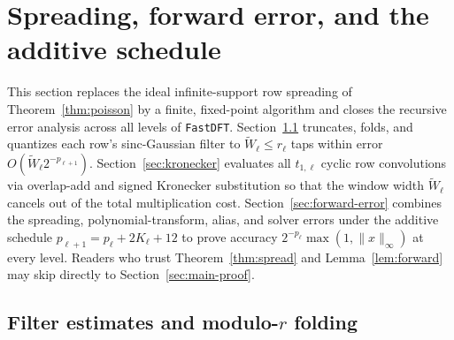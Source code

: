 \section{Spreading, forward error, and the additive schedule}\label{sec:spread-and-error}

This section replaces the ideal infinite-support row spreading of Theorem~\ref{thm:poisson} by a finite, fixed-point algorithm and closes the recursive error analysis across all levels of \texttt{FastDFT}. Section~\ref{sec:filter-norms} truncates, folds, and quantizes each row's sinc-Gaussian filter to $\tilde{W}_\ell \le r_\ell$ taps within error $O(\tilde{W}_\ell 2^{-p_{\ell+1}})$. Section~\ref{sec:kronecker} evaluates all $t_{1,\ell}$ cyclic row convolutions via overlap-add and signed Kronecker substitution so that the window width $\tilde{W}_\ell$ cancels out of the total multiplication cost. Section~\ref{sec:forward-error} combines the spreading, polynomial-transform, alias, and solver errors under the additive schedule $p_{\ell+1} = p_\ell + 2K_\ell + 12$ to prove accuracy $2^{-p_\ell}\max(1, \|x\|_\infty)$ at every level. Readers who trust Theorem~\ref{thm:spread} and Lemma~\ref{lem:forward} may skip directly to Section~\ref{sec:main-proof}.

\subsection{Filter estimates and modulo-\texorpdfstring{$r$}{r} folding}\label{sec:filter-norms}

